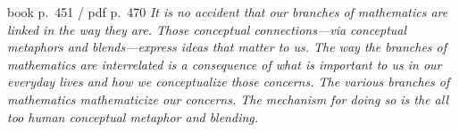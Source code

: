 \begin{keybox}[title={The last words of Part VI}]
\begin{bookquote}{book p.~451 / pdf p.~470}
\textit{It is no accident that our branches of mathematics are linked in the way they are. Those
conceptual connections---via conceptual metaphors and blends---express ideas that matter to us. The
way the branches of mathematics are interrelated is a consequence of what is important to us in our
everyday lives and how we conceptualize those concerns. The various branches of mathematics
mathematicize our concerns. The mechanism for doing so is the all too human conceptual metaphor and
blending.}
\end{bookquote}
\end{keybox}

